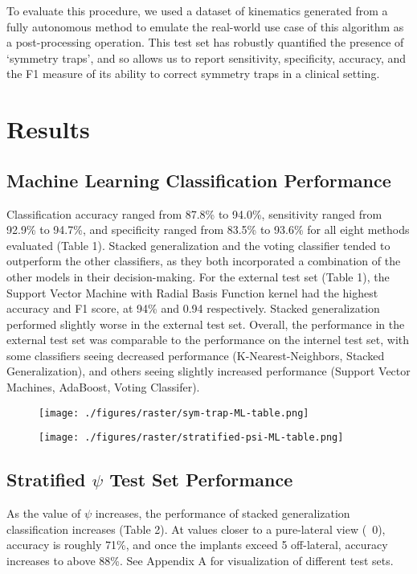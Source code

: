 To evaluate this procedure, we used a dataset of kinematics generated from a fully autonomous method \cite{jensenJointTrackMachine2023} to emulate the real-world use case of this algorithm as a post-processing operation.
This test set has robustly quantified the presence of `symmetry traps', and so allows us to report sensitivity, specificity, accuracy, and the F1 measure of its ability to correct symmetry traps in a clinical setting.

\section{Results}
\subsection{Machine Learning Classification Performance}
Classification accuracy ranged from 87.8\% to 94.0\%, sensitivity ranged from 92.9\% to 94.7\%, and specificity ranged from 83.5\% to 93.6\% for all eight methods evaluated (Table 1).
Stacked generalization and the voting classifier tended to outperform the other classifiers, as they both incorporated a combination of the other models in their decision-making.
For the external test set (Table 1), the Support Vector Machine with Radial Basis Function kernel had the highest accuracy and F1 score, at 94\% and 0.94 respectively.
Stacked generalization performed slightly worse in the external test set.
Overall, the performance in the external test set was comparable to the performance on the internel test set, with some classifiers seeing decreased performance (K-Nearest-Neighbors, Stacked Generalization), and others seeing slightly increased performance (Support Vector Machines, AdaBoost, Voting Classifer).

\begin{figure}
  \centering
  \texttt{[image: ./figures/raster/sym-trap-ML-table.png]}
\end{figure}
\begin{figure}
  \centering
  \texttt{[image: ./figures/raster/stratified-psi-ML-table.png]}
\end{figure}

\subsection{Stratified $\psi$ Test Set Performance}
As the value of $\psi$ increases, the performance of stacked generalization classification increases (Table 2).
At values closer to a pure-lateral view (~0), accuracy is roughly 71\%, and once the implants exceed 5 off-lateral, accuracy increases to above 88\%. See Appendix A for visualization of different test sets.

